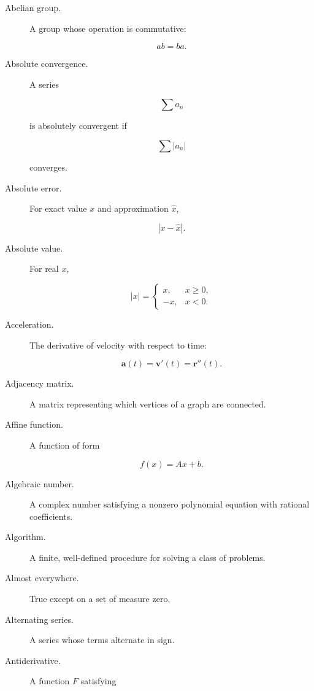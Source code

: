 \begin{description}

\item[Abelian group.]
A group whose operation is commutative:

\[
ab=ba.
\]

\item[Absolute convergence.]
A series

\[
\sum a_n
\]

is absolutely convergent if

\[
\sum |a_n|
\]

converges.

\item[Absolute error.]
For exact value \(x\) and approximation \(\hat{x}\),

\[
\boxed{
|x-\hat{x}|.
}
\]

\item[Absolute value.]
For real \(x\),

\[
|x|
=
\begin{cases}
x, & x\geq0,\\
-x, & x<0.
\end{cases}
\]

\item[Acceleration.]
The derivative of velocity with respect to time:

\[
\mathbf{a}(t)
=
\mathbf{v}'(t)
=
\mathbf{r}''(t).
\]

\item[Adjacency matrix.]
A matrix representing which vertices of a graph are connected.

\item[Affine function.]
A function of form

\[
f(x)=Ax+b.
\]

\item[Algebraic number.]
A complex number satisfying a nonzero polynomial equation with rational
coefficients.

\item[Algorithm.]
A finite, well-defined procedure for solving a class of problems.

\item[Almost everywhere.]
True except on a set of measure zero.

\item[Alternating series.]
A series whose terms alternate in sign.

\item[Antiderivative.]
A function \(F\) satisfying


\end{description}
